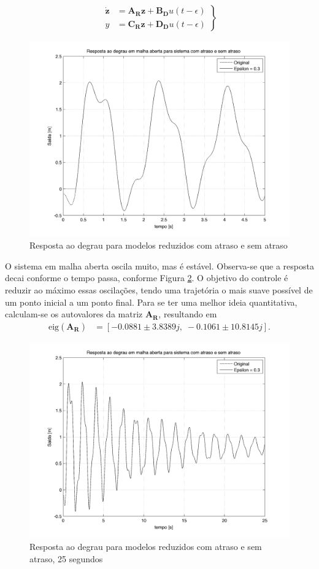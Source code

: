 \begin{align}
	\left.\begin{array}{ll}
		\mathbf{\dot{z}} &= \mathbf{A_R}\mathbf{z} + \mathbf{B_D}u(t-\epsilon)\\
		y &= \mathbf{C_R}\mathbf{z} + \mathbf{D_D}u(t-\epsilon)
	\end{array}\right\}\label{modeloEEComAtraso}
\end{align}

\begin{figure}[!ht]
\centering
\caption{Resposta ao degrau para modelos reduzidos com atraso e sem atraso\label{modeloMalhaAberta}}
\includegraphics[width=0.8\linewidth]{figs/resultados/modelo/respostaMalhaAberta}
\end{figure}

 O sistema em malha aberta oscila muito, mas é estável. Observa-se que a resposta decai conforme o tempo passa, conforme Figura \ref{modeloMalhaAberta25s}. O objetivo do controle é reduzir ao máximo essas oscilações, tendo uma trajetória o mais suave possível de um ponto inicial a um ponto final. Para se ter uma melhor ideia quantitativa, calculam-se os autovalores da matriz $\mathbf{A_R}$, resultando em \begin{align}
 	\mathrm{eig}\left(\mathbf{A_R}\right) &= \left[-0.0881 \pm 3.8389j,\;
  -0.1061 \pm 10.8145j\right].
 \end{align}

\begin{figure}[!ht]
\centering
\caption{Resposta ao degrau para modelos reduzidos com atraso e sem atraso, 25 segundos\label{modeloMalhaAberta25s}}
\includegraphics[width=0.8\linewidth]{figs/resultados/modelo/respostaMalhaAberta25s}
\end{figure}

